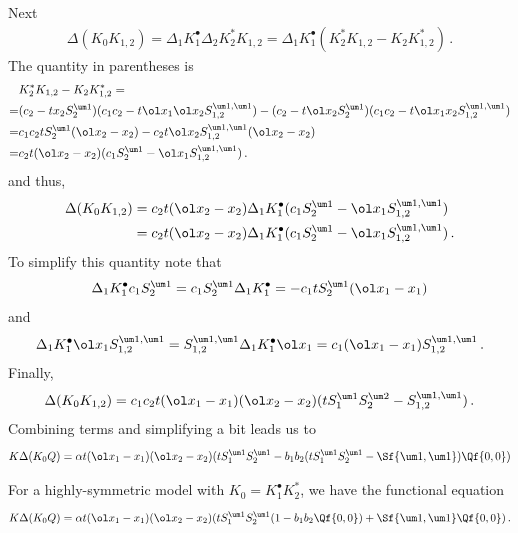 Next
\begin{align}
	\Delta(K_0 K_{1,2}) = \Delta_1 K_1^\bullet \Delta_2 K_2^\ast K_{1,2} = \Delta_1 K_1^\bullet (K_2^\ast K_{1,2}- K_2 K_{1,2}^\ast)\,.
\end{align}
The quantity in parentheses is
\begin{align}\begin{split}
	&K_2^\ast K_{1,2}- K_2 K_{1,2}^\ast =\\
	=& (c_2-tx_2S_2^{\um 1})(c_1c_2-t\ol x_1\ol x_2S_{1,2}^{\um 1, \um 1})-(c_2-t\ol x_2S_2^{\um 1})(c_1c_2-t\ol x_1x_2S_{1,2}^{\um 1, \um 1})\\
	=& c_1c_2tS_2^{\um 1}(\ol x_2-x_2) - c_2t\ol x_2S_{1,2}^{\um 1, \um 1}(\ol x_2-x_2)\\
	=& c_2t(\ol x_2-x_2)(c_1S_2^{\um 1}-\ol x_1S_{1,2}^{\um 1, \um 1})\,.
\end{split}\end{align}
and thus,
\begin{align}\begin{split}
	\Delta(K_0 K_{1,2})  &= c_2t(\ol x_2-x_2) \Delta_1 K_1^\bullet (c_1S_2^{\um 1}-\ol x_1S_{1,2}^{\um 1, \um 1})\\
	&=c_2t(\ol x_2-x_2) \Delta_1 K_1^\bullet (c_1S_2^{\um 1}-\ol x_1S_{1,2}^{\um 1, \um 1})\,.
\end{split}\end{align}
To simplify this quantity note that
\begin{align}
\Delta_1 K_1^\bullet c_1 S_2^{\um 1} = c_1 S_2^{\um 1}\Delta_1 K_1^\bullet = -c_1t S_2^{\um 1}(\ol x_1-x_1)
\end{align}
and
\begin{align}
	\Delta_1 K_1^\bullet \ol x_1S_{1,2}^{\um 1, \um 1} = S_{1,2}^{\um 1, \um 1}\Delta_1 K_1^\bullet \ol x_1 = c_1 (\ol x_1-x_1)S_{1,2}^{\um 1, \um 1}\,.
\end{align}
Finally,
\begin{align}
	\Delta(K_0 K_{1,2}) = c_1c_2t(\ol x_1-x_1)(\ol x_2-x_2)(t S_1^{\um 1} S_2^{\um 2}-S_{1,2}^{\um 1, \um 1})\,.
\end{align}
Combining terms and simplifying a bit leads us to
\begin{align}
	K\Delta(K_0 Q) = \alpha t(\ol x_1-x_1)(\ol x_2-x_2)(tS_1^{\um 1}S_2^{\um 1} - b_1b_2(tS_1^{\um 1}S_2^{\um 1}-\Sf{\um 1, \um 1})\Qf{0,0})
\end{align}
\begin{corollary} For a highly-symmetric model with $K_0 = K_1^\bullet K_2^\ast$, we have the functional equation
\begin{align}
	K\Delta(K_0 Q) = \alpha t(\ol x_1-x_1)(\ol x_2-x_2)(tS_1^{\um 1}S_2^{\um 1}(1 - b_1b_2\Qf{0,0}) + \Sf{\um 1, \um 1}\Qf{0,0})\,.
\end{align}
\end{corollary}
